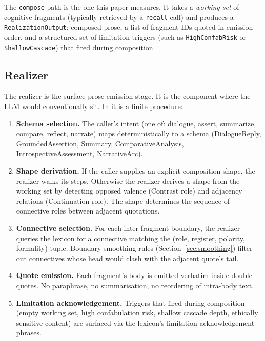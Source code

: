 The \texttt{compose} path is the one this paper measures. It
takes a \emph{working set} of cognitive fragments (typically
retrieved by a \texttt{recall} call) and produces a
\texttt{RealizationOutput}: composed prose, a list of
fragment IDs quoted in emission order, and a structured set of
limitation triggers (such as \texttt{HighConfabRisk} or
\texttt{ShallowCascade}) that fired during composition.

\subsection{Realizer}
\label{sec:realizer}

The realizer is the surface-prose-emission stage. It is the
component where the LLM would conventionally sit. In \hyphae{}
it is a finite procedure:

\begin{enumerate}
    \item \textbf{Schema selection.} The caller's intent (one
    of: dialogue, assert, summarize, compare, reflect, narrate)
    maps deterministically to a schema (DialogueReply,
    GroundedAssertion, Summary, ComparativeAnalysis,
    IntrospectiveAssessment, NarrativeArc).
    \item \textbf{Shape derivation.} If the caller supplies an
    explicit composition shape, the realizer walks its steps.
    Otherwise the realizer derives a shape from the working set
    by detecting opposed valence (Contrast role) and adjacency
    relations (Continuation role). The shape determines the
    sequence of connective roles between adjacent quotations.
    \item \textbf{Connective selection.} For each inter-fragment
    boundary, the realizer queries the lexicon for a connective
    matching the (role, register, polarity, formality) tuple.
    Boundary smoothing rules (Section~\ref{sec:smoothing})
    filter out connectives whose head would clash with the
    adjacent quote's tail.
    \item \textbf{Quote emission.} Each fragment's body is
    emitted verbatim inside double quotes. No paraphrase, no
    summarisation, no reordering of intra-body text.
    \item \textbf{Limitation acknowledgement.} Triggers that
    fired during composition (empty working set, high
    confabulation risk, shallow cascade depth, ethically
    sensitive content) are surfaced via the lexicon's
    limitation-acknowledgement phrases.
\end{enumerate}

